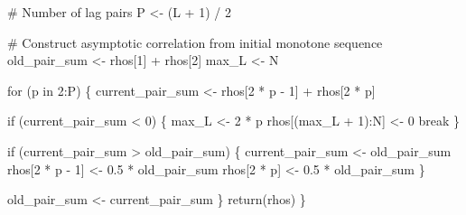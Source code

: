 \documentclass[
  letterpaper,
  DIV=11,
  numbers=noendperiod]{scrartcl}
\newenvironment{Shaded}{\begin{snugshade}}{\end{snugshade}}
\newcommand{\CommentTok}[1]{\textcolor[rgb]{0.37,0.37,0.37}{#1}}
\newcommand{\ControlFlowTok}[1]{\textcolor[rgb]{0.00,0.23,0.31}{#1}}
\newcommand{\DecValTok}[1]{\textcolor[rgb]{0.68,0.00,0.00}{#1}}
\newcommand{\FloatTok}[1]{\textcolor[rgb]{0.68,0.00,0.00}{#1}}
\newcommand{\KeywordTok}[1]{\textcolor[rgb]{0.00,0.23,0.31}{#1}}
\newcommand{\NormalTok}[1]{\textcolor[rgb]{0.00,0.23,0.31}{#1}}
\newcommand{\OperatorTok}[1]{\textcolor[rgb]{0.37,0.37,0.37}{#1}}
\begin{document}
\begin{Shaded}
\begin{Highlighting}[]
  \CommentTok{\# Number of lag pairs}
\NormalTok{  P }\OperatorTok{\textless{}{-}}\NormalTok{ (L }\OperatorTok{+} \DecValTok{1}\NormalTok{) }\OperatorTok{/} \DecValTok{2}

  \CommentTok{\# Construct asymptotic correlation from initial monotone sequence}
\NormalTok{  old\_pair\_sum }\OperatorTok{\textless{}{-}}\NormalTok{ rhos[}\DecValTok{1}\NormalTok{] }\OperatorTok{+}\NormalTok{ rhos[}\DecValTok{2}\NormalTok{]}
\NormalTok{  max\_L }\OperatorTok{\textless{}{-}}\NormalTok{ N}

  \ControlFlowTok{for}\NormalTok{ (p }\KeywordTok{in} \DecValTok{2}\NormalTok{:P) \{}
\NormalTok{    current\_pair\_sum }\OperatorTok{\textless{}{-}}\NormalTok{ rhos[}\DecValTok{2} \OperatorTok{*}\NormalTok{ p }\OperatorTok{{-}} \DecValTok{1}\NormalTok{] }\OperatorTok{+}\NormalTok{ rhos[}\DecValTok{2} \OperatorTok{*}\NormalTok{ p]}
  
    \ControlFlowTok{if}\NormalTok{ (current\_pair\_sum }\OperatorTok{\textless{}} \DecValTok{0}\NormalTok{) \{}
\NormalTok{      max\_L }\OperatorTok{\textless{}{-}} \DecValTok{2} \OperatorTok{*}\NormalTok{ p}
\NormalTok{      rhos[(max\_L }\OperatorTok{+} \DecValTok{1}\NormalTok{):N] }\OperatorTok{\textless{}{-}} \DecValTok{0}
      \ControlFlowTok{break}
\NormalTok{    \}}
  
    \ControlFlowTok{if}\NormalTok{ (current\_pair\_sum }\OperatorTok{\textgreater{}}\NormalTok{ old\_pair\_sum) \{}
\NormalTok{      current\_pair\_sum }\OperatorTok{\textless{}{-}}\NormalTok{ old\_pair\_sum}
\NormalTok{      rhos[}\DecValTok{2} \OperatorTok{*}\NormalTok{ p }\OperatorTok{{-}} \DecValTok{1}\NormalTok{] }\OperatorTok{\textless{}{-}} \FloatTok{0.5} \OperatorTok{*}\NormalTok{ old\_pair\_sum}
\NormalTok{      rhos[}\DecValTok{2} \OperatorTok{*}\NormalTok{ p] }\OperatorTok{\textless{}{-}} \FloatTok{0.5} \OperatorTok{*}\NormalTok{ old\_pair\_sum}
\NormalTok{    \}}
  
\NormalTok{    old\_pair\_sum }\OperatorTok{\textless{}{-}}\NormalTok{ current\_pair\_sum}
\NormalTok{  \}}
  \ControlFlowTok{return}\NormalTok{(rhos)}
\NormalTok{\}}
\end{Highlighting}
\end{Shaded}
\end{document}
